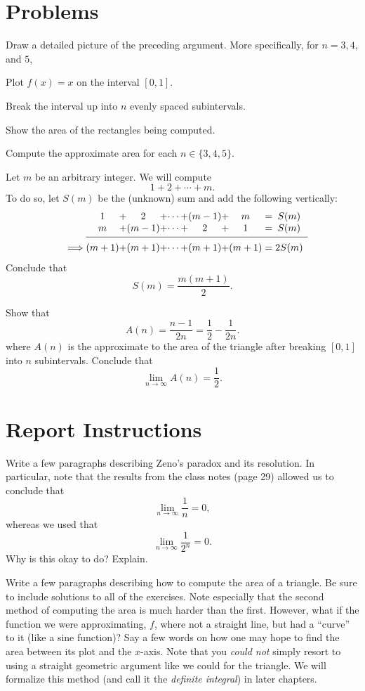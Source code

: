 \section{Problems}
\problemfont
\problem Draw a detailed picture of the preceding argument.  More
specifically, for $n = 3, 4$, and $5$,

\subprob Plot $f(x) = x$ on the interval $[0,1]$.

\subprob Break the interval up into $n$ evenly spaced subintervals.

\subprob Show the area of the rectangles being computed.

\subprob Compute the approximate area for each $n\in \{3,4,5\}$.

\problem Let $m$ be an arbitrary integer.  We will compute
\[
1 + 2 + \cdots + m.
\]
To do so, let $S(m)$ be the (unknown) sum and add the following
vertically:
\[
\begin{array}[h]{c*{11}{@{}c}}
  &1& +& 2 &+& \cdots& + &(m-1)& +&  m &\;=\;& S(m)\\
 \rule[-6pt]{0pt}{14pt}
 & m& +& (m - 1)& +& \cdots& + &2& + &1 & = &S(m)\\
 \cline{2-12}
 \rule{0pt}{14pt}
  \implies& (m+1)& +& (m + 1)& +& \cdots&+& (m+1)& +& (m+1) &=& 2S(m)
\end{array}
\]
Conclude that
\[
S(m) = \frac{m(m+1)}{2}.
\]


\problem
Show that
\[
A(n) = \frac{n - 1}{2n} = \frac{1}{2} - \frac{1}{2n}.
\]
where $A(n)$ is the approximate to the area of the triangle after
breaking $[0,1]$ into $n$ subintervals.  Conclude that
\[
\lim_{n \to \infty} A(n) = \frac{1}{2}.
\]

\noproblemfont
\bigskip

\section*{Report Instructions}
Write a few paragraphs describing Zeno's paradox and its resolution.
In particular, note that the results from the class notes (page 29)
allowed us to conclude that
\[
\lim_{n \to \infty} \frac{1}{n} = 0,
\]
whereas we used that
\[
\lim_{n \to \infty} \frac{1}{2^n} = 0.
\]
Why is this okay to do?  Explain.

Write a few paragraphs describing how to compute the area of a
triangle.  Be sure to include solutions to all of the exercises.  Note
especially that the second method of computing the area is much harder
than the first.  However, what if the function we were approximating,
$f$, where not a straight line, but had a ``curve'' to it (like a sine
function)?  Say a few words on how one may hope to find the area
between its plot and the $x$-axis.  Note that you \textit{could not}
simply resort to using a straight geometric argument like we could for
the triangle.  We will formalize this method (and call it the
\textit{definite integral}) in later chapters.

